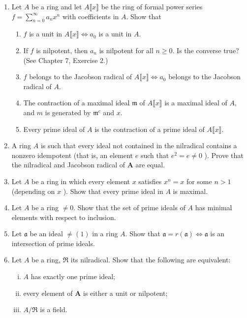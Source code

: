 \documentclass[class=book, crop=false]{standalone}
\theoremstyle{definition}
\theoremstyle{remark}
\begin{document}
\begin{enumerate}[series=exc1]
  \item Let $A$ be a ring and let $A\lBrack x\rBrack $ be the ring of formal power series
  $f=\sum_{n=0}^{\infty} a_{n} x^{n}$ with coefficients in $A$. Show that
  \begin{enumerate}
    \item $f$ is a unit in $A\lBrack x\rBrack  \iff a_{0}$ is a unit in $A$.
    \item If $f$ is nilpotent, then $a_{n}$ is nilpotent for all $n \geq 0$. Is the
converse true? (See Chapter 7, Exercise 2.)
    \item $f$ belongs to the Jacobson radical of $A\lBrack x\rBrack  \iff a_{0}$
belongs to the Jacobson radical of $A$.
    \item The contraction of a maximal ideal $\mathfrak{m}$ of $A\lBrack x\rBrack $ is a maximal
ideal of $A$, and $m$ is generated by $\mathfrak{m}^{c}$ and $x$.
    \item Every prime ideal of $A$ is the contraction of a prime ideal of $A\lBrack x\rBrack $.
  \end{enumerate}

  \item A ring $A$ is such that every ideal not contained in the nilradical
        contains a nonzero idempotent (that is, an element $e$ such that
        $e^{2}=e \neq 0$ ). Prove that the nilradical and Jacobson radical of
        $\boldsymbol{A}$ are equal.

  \item Let $A$ be a ring in which every element $x$ satisfies $x^{n}=x$ for
        some $n>1$ (depending on $x$ ). Show that every prime ideal in $A$ is
        maximal.

  \item Let $A$ be a ring $\neq 0$. Show that the set of prime ideals of $A$ has
        minimal elements with respect to inclusion.

  \item Let $\mathfrak{a}$ be an ideal $\neq (1)$ in a ring $A$. Show that
        $\mathfrak{a}=r(\mathfrak{a}) \iff \mathfrak{a}$ is an
        intersection of prime ideals.

  \item Let $A$ be a ring, $\Re$ its nilradical. Show that the following are
        equivalent:
\begin{enumerate}[i)]
  \item $A$ has exactly one prime ideal;
  \item every element of $\boldsymbol{A}$ is either a unit or nilpotent;
  \item $A / \Re$ is a field.
\end{enumerate}


\end{enumerate}
\end{document}
